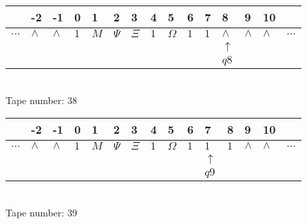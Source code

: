 \documentclass{article}
\begin{document}
\begin{table}[H]
\centering
\begin{tabular}{lllllllllllllll}
 & -2 & -1 & 0 & 1 & 2 & 3 & 4 & 5 & 6 & 7 & 8 & 9 & 10 & \\
\hline
$...$ & \multicolumn{1}{|l|}{$\wedge$} & \multicolumn{1}{|l|}{$\wedge$} & \multicolumn{1}{|l|}{$1$} & \multicolumn{1}{|l|}{$M$} & \multicolumn{1}{|l|}{$\Psi$} & \multicolumn{1}{|l|}{$\Xi$} & \multicolumn{1}{|l|}{$1$} & \multicolumn{1}{|l|}{$\Omega$} & \multicolumn{1}{|l|}{$1$} & \multicolumn{1}{|l|}{$1$} & \multicolumn{1}{|l|}{$\wedge$} & \multicolumn{1}{|l|}{$\wedge$} & \multicolumn{1}{|l|}{$\wedge$} & $...$\\
\hline
&  &  &  &  &  &  &  &  &  &  & $\uparrow$ &  &  &  \\
&  &  &  &  &  &  &  &  &  &  & $ q8 $ &  &  &  \\
\end{tabular}
\\
Tape number: 38
\noindent\makebox[\linewidth]{\hdashrule{\textwidth}{1pt}{1pt}}\end{table}

\begin{table}[H]
\centering
\begin{tabular}{lllllllllllllll}
 & -2 & -1 & 0 & 1 & 2 & 3 & 4 & 5 & 6 & 7 & 8 & 9 & 10 & \\
\hline
$...$ & \multicolumn{1}{|l|}{$\wedge$} & \multicolumn{1}{|l|}{$\wedge$} & \multicolumn{1}{|l|}{$1$} & \multicolumn{1}{|l|}{$M$} & \multicolumn{1}{|l|}{$\Psi$} & \multicolumn{1}{|l|}{$\Xi$} & \multicolumn{1}{|l|}{$1$} & \multicolumn{1}{|l|}{$\Omega$} & \multicolumn{1}{|l|}{$1$} & \multicolumn{1}{|l|}{$1$} & \multicolumn{1}{|l|}{$1$} & \multicolumn{1}{|l|}{$\wedge$} & \multicolumn{1}{|l|}{$\wedge$} & $...$\\
\hline
&  &  &  &  &  &  &  &  &  & $\uparrow$ &  &  &  &  \\
&  &  &  &  &  &  &  &  &  & $ q9 $ &  &  &  &  \\
\end{tabular}
\\
Tape number: 39
\noindent\makebox[\linewidth]{\hdashrule{\textwidth}{1pt}{1pt}}\end{table}
\end{document}
